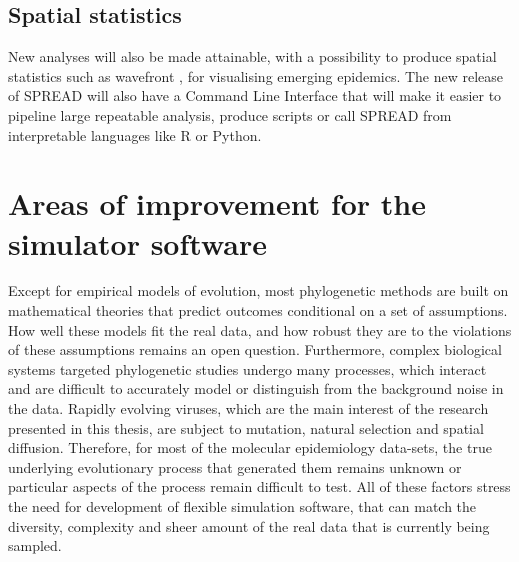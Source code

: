 \subsection{Spatial statistics}

New analyses will also be made attainable, with a possibility to produce spatial statistics such as wavefront \citep{Pybus2012}, for visualising emerging epidemics.
The new release of SPREAD will also have a Command Line Interface that will make it easier to pipeline large repeatable analysis, produce scripts or call SPREAD from interpretable languages like R \citep{RCran} or Python.


\section{Areas of improvement for the {\bussname} simulator software}

Except for empirical models of evolution, most phylogenetic methods are built on mathematical theories that predict outcomes conditional on a set of assumptions.
How well these models fit the real data, and how robust they are to the violations of these assumptions remains an open question.
Furthermore, complex biological systems targeted phylogenetic studies undergo many processes, which interact and are difficult to accurately model or distinguish from the background noise in the data.
Rapidly evolving viruses, which are the main interest of the research presented in this thesis, are subject to mutation, natural selection and spatial diffusion.
Therefore, for most of the molecular epidemiology data-sets, the true underlying evolutionary process that generated them remains unknown or particular aspects of the process remain difficult to test.
All of these factors stress the need for development of flexible simulation software, that can match the diversity, complexity and sheer amount of the real data that is currently being sampled.

